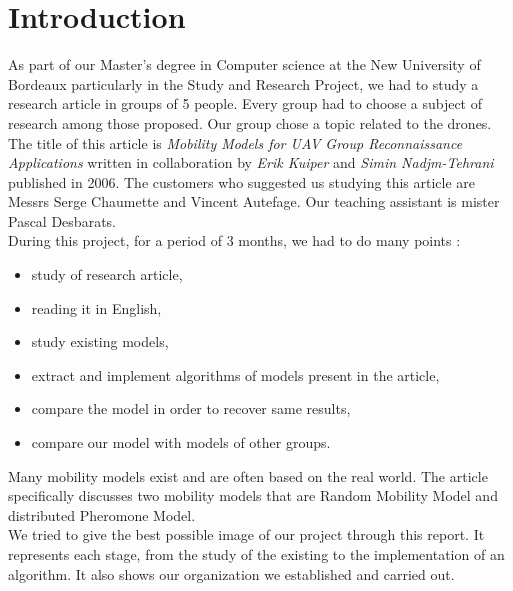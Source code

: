 \chapter*{Introduction}

As part of our Master's degree in Computer science at the New University of Bordeaux particularly in the Study and Research Project, we had to study a research article in groups of 5 people. Every group had to choose a subject of research among those proposed. Our group chose a topic related to the drones. The title of this article is \textit{Mobility Models for UAV Group Reconnaissance Applications} written in collaboration by \textit{Erik Kuiper} and \textit{Simin Nadjm-Tehrani} published in 2006. The customers who suggested us studying this article are Messrs Serge Chaumette and Vincent Autefage. Our teaching assistant is mister Pascal Desbarats.\\

\noindent During this project, for a period of 3 months, we had to do many points :
\begin{itemize}
\item study of research article,
\item reading it in English,
\item study existing models,
\item extract and implement algorithms of models present in the article,
\item compare the model in order to recover same results,
\item compare our model with models of other groups.
\end{itemize}

Many mobility models exist and are often based on the real world.
The article specifically discusses two mobility models that are Random Mobility Model and distributed Pheromone Model.\\

We tried to give the best possible image of our project through this report. It represents each stage, from the study of the existing to the implementation of an algorithm. It also shows our organization we established and carried out. 

